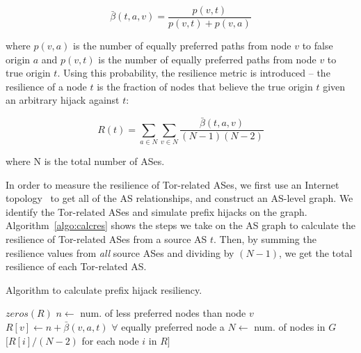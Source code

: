 \begin{equation}
\bar{\beta}(t,a,v) = \frac {p(v,t)} {p(v,t) + p(v,a)}
\end{equation}

where $p(v,a)$ is the number of equally preferred paths from node $v$ to false origin $a$ and $p(v,t)$ is the number of equally preferred paths from node $v$ to true origin $t$.  Using this probability, the resilience metric is introduced -- the resilience of a node $t$ is the fraction of nodes that believe the true origin $t$ given an arbitrary hijack against $t$:

\begin{equation}
R(t) = \sum_{a \in N} \sum_{v \in N} \frac {\bar{\beta}(t,a,v)} {(N-1)(N-2)}
\end{equation}

where N is the total number of ASes.

In order to measure the resilience of Tor-related ASes, we first use an Internet topology~\cite{caida} to get all of the AS relationships, and construct an AS-level graph.  We identify the Tor-related ASes and simulate prefix hijacks on the graph. Algorithm~\ref{algo:calcres} shows the steps we take on the AS graph to calculate the resilience of Tor-related ASes from a source AS $t$. Then, by summing the resilience values from \emph{all} source ASes and dividing by $(N-1)$, we get the total resilience of each Tor-related AS.



\begin{algorithm}
\caption{Algorithm to calculate prefix hijack resiliency.}
\label{algo:calcres}
\begin{algorithmic}
    \State {}
    \State $zeros(R)$
		\State $n \gets $ num. of less preferred nodes than node $v$
		\State $R[v] \gets n + \bar{\beta}(v,a,t)$ $\forall$ equally preferred node a
	\EndIf
    \EndFor
    \State $N \gets$ num. of nodes in $G$
    \State \Return $[R[i] / (N-2)$ for each node $i$ in $R]$
\EndFunction
\end{algorithmic}
\end{algorithm}

